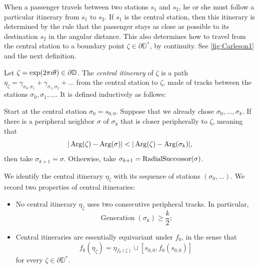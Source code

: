 When a passenger travels between two stations $s_1$ and $s_2$, he or she must follow a particular itinerary from $s_1$ to $s_2$.
If $s_1$ is the central station, then this itinerary is determined by the rule that the passenger stays as close as possible to its destination $s_2$ in the angular distance.
This also determines how to travel from the central station to a boundary point $\zeta\in \partial \mathbb D^*$, by continuity. 
See \cref{fig:Carleson1} and the next definition.


\begin{definition}
Let $\zeta=\exp(2\pi i\theta)\in\partial\mathbb{D}$. 
The \emph{central itinerary} of $\zeta$ is a path 
$\eta_\zeta = \gamma _{\sigma_0,\sigma_1} + \gamma_{\sigma_1,\sigma_2}+\ldots$ 
from the central station to $\zeta$, made of tracks between the stations 
$\sigma_0,\sigma_1,\dots$. It is defined inductively as follows:

Start at the central station $\sigma_0=s_{0,0}$. Suppose that we already chose $\sigma_0,\ldots,\sigma_k$. If there is a peripheral neighbor $\sigma$ of $\sigma_k$ that is closer peripherally to $\zeta$, meaning that
$$
|\operatorname{Arg}(\zeta)-\operatorname{Arg}(\sigma)|
< |\operatorname{Arg}(\zeta)-\operatorname{Arg}(\sigma_{k})|,
$$
then take $\sigma_{k+1}=\sigma$. Otherwise, take $\sigma_{k+1}=\operatorname{RadialSuccessor}(\sigma)$.
\end{definition}



We identify the central itinerary $\eta_{\zeta}$ with its sequence of stations $(\sigma_0,\ldots)$. We record two properties of central itineraries:

\begin{itemize}
	\item No central itinerary $\eta_{\zeta}$ uses two consecutive peripheral tracks. In particular,
	\begin{equation}
	\label{generation-lower-bound}
		\operatorname{Generation}(\sigma_k)\geq \frac k2;
	\end{equation}
	
	\item Central itineraries are essentially equivariant under $f_{0}$, in the sense that
	\begin{equation*}
		f_{0}(\eta_{\zeta})=\eta{}_{f_{0}(\zeta)}\cup[s_{0,0},f_0(s_{0,0})]
	\end{equation*}
	for every $\zeta\in \partial \mathbb D^*$.
\end{itemize}

